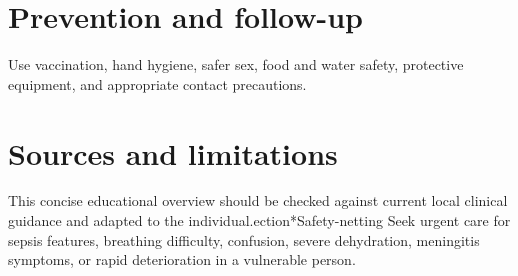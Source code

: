 \section*{Prevention and follow-up}
Use vaccination, hand hygiene, safer sex, food and water safety, protective equipment, and appropriate contact precautions.

\section*{Sources and limitations}
This concise educational overview should be checked against current local clinical guidance and adapted to the individual.ection*{Safety-netting}
Seek urgent care for sepsis features, breathing difficulty, confusion, severe dehydration, meningitis symptoms, or rapid deterioration in a vulnerable person.
